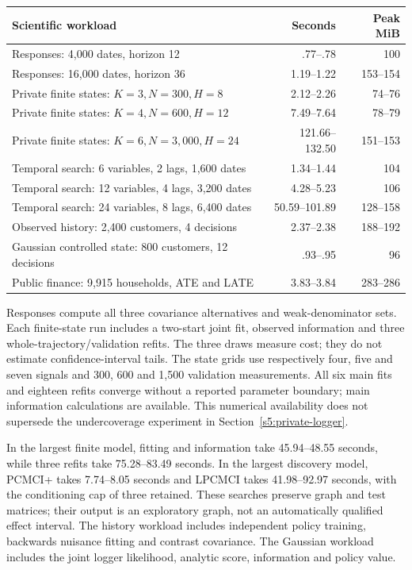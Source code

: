 \begin{center}\small
\begin{tabular}{P{.57\textwidth}rr}\toprule
Scientific workload & Seconds & Peak MiB\\\midrule
Responses: 4,000 dates, horizon 12 & .77--.78 & 100\\
Responses: 16,000 dates, horizon 36 & 1.19--1.22 & 153--154\\
Private finite states: $K=3,N=300,H=8$ & 2.12--2.26 & 74--76\\
Private finite states: $K=4,N=600,H=12$ & 7.49--7.64 & 78--79\\
Private finite states: $K=6,N=3,000,H=24$ & 121.66--132.50 & 151--153\\
Temporal search: 6 variables, 2 lags, 1,600 dates & 1.34--1.44 & 104\\
Temporal search: 12 variables, 4 lags, 3,200 dates & 4.28--5.23 & 106\\
Temporal search: 24 variables, 8 lags, 6,400 dates & 50.59--101.89 & 128--158\\
Observed history: 2,400 customers, 4 decisions & 2.37--2.38 & 188--192\\
Gaussian controlled state: 800 customers, 12 decisions & .93--.95 & 96\\
Public finance: 9,915 households, ATE and LATE & 3.83--3.84 & 283--286\\\bottomrule
\end{tabular}\end{center}
Responses compute all three covariance alternatives and weak-denominator
sets. Each finite-state run includes a two-start joint fit, observed
information and three whole-trajectory/validation refits. The three draws
measure cost; they do not estimate confidence-interval tails. The state grids
use respectively four, five and seven signals and 300, 600 and 1,500
validation measurements. All six main fits and eighteen refits converge
without a reported parameter boundary; main information calculations are
available. This numerical availability does not supersede the undercoverage
experiment in Section~\ref{s5:private-logger}.

In the largest finite model, fitting and information take 45.94--48.55
seconds, while three refits take 75.28--83.49 seconds. In the largest
discovery model, PCMCI+ takes 7.74--8.05 seconds and LPCMCI takes
41.98--92.97 seconds, with the conditioning cap of three retained.
These searches preserve graph and test matrices; their output is an
exploratory graph, not an automatically qualified effect interval. The
history workload includes independent policy training, backwards nuisance
fitting and contrast covariance. The Gaussian workload includes the joint
logger likelihood, analytic score, information and policy value.

